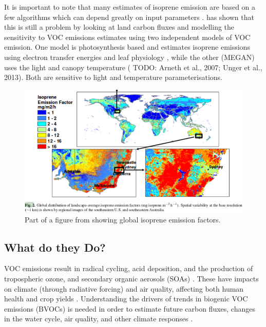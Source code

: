     It is important to note that many estimates of isoprene emission are based on a few algorithms which can depend greatly on input parameters \citep{Niinemets2010}.
    \citet{Yue2015} has shown that this is still a problem by looking at land carbon fluxes and modelling the sensitivity to VOC emissions estimates using two independent models of VOC emission.
    One model is photosynthesis based and estimates isoprene emissions using electron transfer energies and leaf physiology \citep{Niinemets1999}, while the other (MEGAN) uses the light and canopy temperature (\citep{Guenther1995} TODO: Arneth et al., 2007; Unger et al., 2013).
    Both are sensitive to light and temperature parameterisations.
    
    \begin{figure}
      \includegraphics[width=\textwidth]{Figures/MeganIsoprene1.png}
      \caption{ Part of a figure from \citet{Guenther2006} showing global isoprene emission factors. }
      \label{ch_LitRev:fig:meganisoprene}
    \end{figure}
    
  \subsection{What do they Do?}
    VOC emissions result in radical cycling, acid deposition, and the production of tropospheric ozone, and secondary organic aerosols (SOAs) \citep{Atkinson2000, Kanakidou2005}.
    These have impacts on climate (through radiative forcing) and air quality, affecting both human health and crop yields \citep{IPCC_Chapter2, Avnery2011, Lelieveld2015}.
    Understanding the drivers of trends in biogenic VOC emissions (BVOCs) is needed in order to estimate future carbon fluxes, changes in the water cycle, air quality, and other climate responses \citep{Yue2015}.
    
